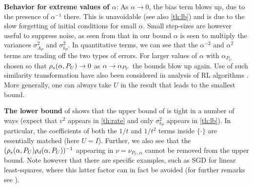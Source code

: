 \textbf{Behavior for extreme values of $\alpha$}: As $\alpha\to 0$, the bias term blows up, due to the presence of $\alpha^{-1}$ there. This is unavoidable (see also \cref{th:lb}) and is due to the slow forgetting of initial conditions for small $\alpha$. Small step-sizes are however useful to suppress noise, as seen from that in our bound $\alpha$ is seen to multiply the variances $\sigma^2_{A_P}$ and $\sigma^2_{b_P}$. In quantitative terms, we can see that the $\alpha^{-2}$ and $\alpha^2$ terms are trading off the two types of errors. For larger values of $\alpha$ with $\alpha_{P_U}$ chosen so that $\rho_s(\alpha,P_U)\rightarrow 0$ as $\alpha\rightarrow \alpha_{P_U}$ the bounds blow up again. 
Use of such similarity transformation have also been considered in analysis of RL algorithms \cite{lihong}. More generally, one can always take $U$ in the result that leads to the smallest bound.
\begin{comment}
\textbf{Proof Sketch:} We can expand the MSE as $\EE{\norm{\eh_t}^2}=\tfrac{1}{(t+1)^2}\, \ip{ \textstyle\sum_{s=0}^t e_s,\textstyle\sum_{s=0}^t e_s}\,,$
where $\eh_t = \thh_t-\ts$ and $e_t = \theta_t-\ts$, and the inner product is a summation of \emph{diagonal} terms $\EE{\ip{e_s,e_s}}$ and \emph{cross} terms of $\EE{\ip{e_s,e_q}}$, $s\neq q$. Since, we also use a basis transformation via $U$, the growth of the diagonal terms and the cross terms depends on the spectral norm of the random matrices $I-\alpha \Lambda_t$ and that of the deterministic matrix $I-\alpha \Lambda$, respectively. This explains the reason as to why $\rhos{P_U}$ and $\rhod{P_U} $ appear in the bounds.
\end{comment}

\textbf{The lower bound} of  shows that the upper bound of  is tight in a number of ways (expect that $v^2$ appears in \cref{th:rate} and only $\sigma^2_{b_P}$ appears in \cref{th:lb}).
In particular, the coefficients of both the $1/t$ and $1/t^2$ terms inside $\{ \cdot \}$ are essentially matched (here $U=I$).
Further, we also see that the $(\rho_s(\alpha,P_U)\rho_d(\alpha,P_U))^{-1}$ appearing in $\nu = \nu_{P_U,\alpha}$ cannot be removed from the upper bound. 
Note however that there are specific examples, such as SGD for linear least-squares,
where this latter factor can in fact be avoided (for further remarks see ).



